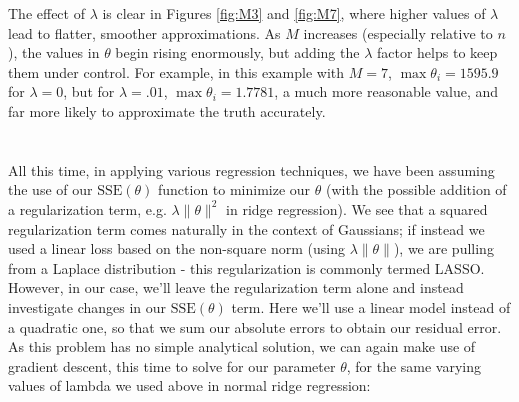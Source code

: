 \documentclass[11pt,letterpaper]{article}
\begin{document}
The effect of $\lambda$ is clear in Figures \ref{fig:M3} and \ref{fig:M7}, where higher values of $\lambda$ lead to flatter, smoother approximations. As $M$ increases (especially relative to $n$), the values in $\theta$ begin rising enormously, but adding the $\lambda$ factor helps to keep them under control. For example, in this example with $M=7$, $\max \theta_i = 1595.9$ for $\lambda = 0$, but for $\lambda = .01$, $\max \theta_i = 1.7781$, a much more reasonable value, and far more likely to approximate the truth accurately.

\section{}
All this time, in applying various regression techniques, we have been assuming the use of our $\text{SSE}(\theta)$ function to minimize our $\theta$ (with the possible addition of a regularization term, e.g. $\lambda\lVert\theta\rVert^2$ in ridge regression). We see that a squared regularization term comes naturally in the context of Gaussians; if instead we used a linear loss based on the non-square norm (using $\lambda\lVert\theta\rVert$), we are pulling from a Laplace distribution - this regularization is commonly termed LASSO.\\
However, in our case, we'll leave the regularization term alone and instead investigate changes in our $\text{SSE}(\theta)$ term. Here we'll use a linear model instead of a quadratic one, so that we sum our absolute errors to obtain our residual error.\\
As this problem has no simple analytical solution, we can again make use of gradient descent, this time to solve for our parameter $\theta$, for the same varying values of lambda we used above in normal ridge regression:
\end{document}

